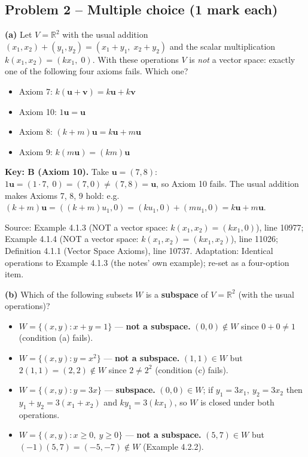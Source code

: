 \documentclass[11pt,a4paper]{article}
\newcommand{\Src}[1]{{\footnotesize\color{black!65}Source: #1}}
\begin{document}
\subsection*{Problem 2 -- Multiple choice (1 mark each)}
\textbf{(a)} Let $V=\mathbb{R}^2$ with the usual addition $(x_1,x_2)+(y_1,y_2)=(x_1+y_1,\;x_2+y_2)$ and the scalar multiplication $k(x_1,x_2)=(kx_1,\;0)$. With these operations $V$ is \emph{not} a vector space: exactly one of the following four axioms fails. Which one?\par
\begin{itemize}[leftmargin=8mm,itemsep=0pt]\item[A] Axiom 7: $k(\mathbf{u}+\mathbf{v})=k\mathbf{u}+k\mathbf{v}$\item[B$^{\ast}$] Axiom 10: $1\mathbf{u}=\mathbf{u}$\item[C] Axiom 8: $(k+m)\mathbf{u}=k\mathbf{u}+m\mathbf{u}$\item[D] Axiom 9: $k(m\mathbf{u})=(km)\mathbf{u}$\end{itemize}
\textbf{Key: B (Axiom 10).} Take $\mathbf{u}=(7,8)$: $1\mathbf{u}=(1\cdot7,\;0)=(7,0)\neq(7,8)=\mathbf{u}$, so Axiom 10 fails. The usual addition makes Axioms 7, 8, 9 hold: e.g. $(k+m)\mathbf{u}=((k+m)u_1,0)=(ku_1,0)+(mu_1,0)=k\mathbf{u}+m\mathbf{u}$.\par
\Src{Example 4.1.3 (NOT a vector space: $k(x_1,x_2)=(kx_1,0)$), line 10977; Example 4.1.4 (NOT a vector space: $k(x_1,x_2)=(kx_1,x_2)$), line 11026; Definition 4.1.1 (Vector Space Axioms), line 10737. Adaptation: Identical operations to Example 4.1.3 (the notes' own example); re-set as a four-option item.}\par
\textbf{(b)} Which of the following subsets $W$ is a \textbf{subspace} of $V=\mathbb{R}^2$ (with the usual operations)?\par
\begin{itemize}[leftmargin=8mm,itemsep=0pt]\item[A] $W=\{(x,y) : x+y=1\}$ --- \textbf{not a subspace.} $(0,0)\notin W$ since $0+0\neq1$ (condition (a) fails).\item[B] $W=\{(x,y) : y=x^2\}$ --- \textbf{not a subspace.} $(1,1)\in W$ but $2(1,1)=(2,2)\notin W$ since $2\neq2^2$ (condition (c) fails).\item[C$^{\ast}$] $W=\{(x,y) : y=3x\}$ --- \textbf{subspace.} $(0,0)\in W$; if $y_1=3x_1,\ y_2=3x_2$ then $y_1+y_2=3(x_1+x_2)$ and $ky_1=3(kx_1)$, so $W$ is closed under both operations.\item[D] $W=\{(x,y) : x\ge0,\ y\ge0\}$ --- \textbf{not a subspace.} $(5,7)\in W$ but $(-1)(5,7)=(-5,-7)\notin W$ (Example 4.2.2).\end{itemize}
\end{document}
